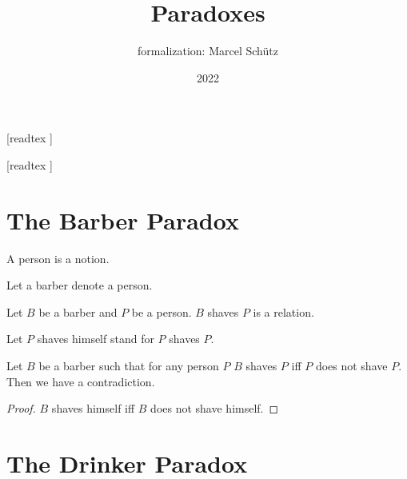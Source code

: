 \documentclass{article}
\title{Paradoxes}
\author{\Naproche formalization: Marcel Schütz}
\date{2022}
\begin{document}
  \maketitle

  \begin{forthel}

    [readtex ]

    [readtex ]
  \end{forthel}


  \section*{The Barber Paradox}

  \begin{forthel}
    \begin{signature}
      A person is a notion.
    \end{signature}

    Let a barber denote a person.

    \begin{signature}
      Let $B$ be a barber and $P$ be a person.
      $B$ shaves $P$ is a relation.
    \end{signature}

    Let $P$ shaves himself stand for $P$ shaves $P$.

    \begin{theorem}
      Let $B$ be a barber such that for any person $P$ $B$ shaves $P$ iff $P$
      does not shave $P$.
      Then we have a contradiction.
    \end{theorem}
    \begin{proof}
      $B$ shaves himself iff $B$ does not shave himself.
    \end{proof}
  \end{forthel}


  \section*{The Drinker Paradox}
\end{document}
